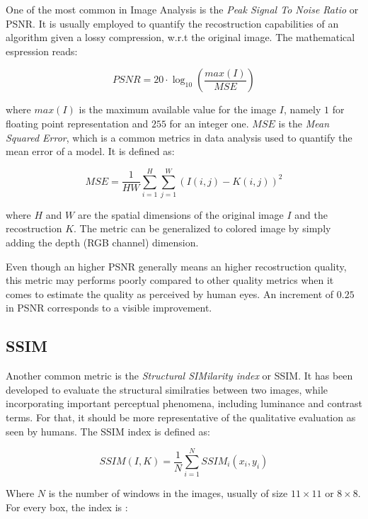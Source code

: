 \documentclass[12pt,a4paper]{report}
\begin{document}
One of the most common in Image Analysis is the {\it Peak Signal To Noise Ratio} or PSNR. 
It is usually employed to quantify the recostruction capabilities of an algorithm given a lossy compression, w.r.t the original image. The mathematical espression reads: 

\begin{equation}
 PSNR = 20 \cdot \log_{10} (\frac{max(I)}{MSE})
\end{equation}

where $max(I)$ is the maximum available value for the image $I$, namely $1$ for floating point representation and $255$ for an integer one. 
$MSE$ is the {\it Mean Squared Error}, which is a common metrics in data analysis used to quantify the mean error of a model. It is defined as:

\begin{equation}
 MSE = \frac{1}{HW}\sum_{i=1}^{H} \sum_{j=1}^W (I(i, j) - K(i,j))^2
\end{equation}
 
where $H$ and $W$ are the spatial dimensions of the original image $I$ and the recostruction $K$. 
The metric can be generalized to colored image by simply adding the depth (RGB channel) dimension.

Even though an higher PSNR generally means an higher recostruction quality, this metric may performs poorly compared to other quality metrics when it comes to estimate the quality as perceived by human eyes. An increment of $0.25$ in PSNR corresponds to a visible improvement.
 
\subsection*{SSIM}

Another common metric is the {\it Structural SIMilarity index} or SSIM. It has been developed to evaluate the structural similraties between two images,  while incorporating important perceptual phenomena, including luminance and contrast terms. For that, it should be more representative of the qualitative evaluation as seen by humans.
The SSIM index is defined as: 

\begin{equation}
 SSIM(I, K) = \frac{1}{N} \sum_{i=1}^{N} SSIM_i(x_i, y_i)
\end{equation}

Where $N$ is the number of windows in the images, usually of size $11 \times 11$ or $8 \times 8$. For every box, the index is : 
\end{document}
